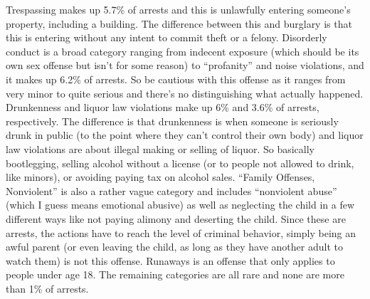 \documentclass[
]{krantz}
\begin{document}
Trespassing makes up 5.7\% of arrests and this is unlawfully
entering someone's property, including a building. The
difference between this and burglary is that this is
entering without any intent to commit theft or a felony.
Disorderly conduct is a broad category ranging from indecent
exposure (which should be its own sex offense but isn't for
some reason) to ``profanity'' and noise violations, and it
makes up 6.2\% of arrests. So be cautious with this offense
as it ranges from very minor to quite serious and there's no
distinguishing what actually happened. Drunkenness and
liquor law violations make up 6\% and 3.6\% of arrests,
respectively. The difference is that drunkenness is when
someone is seriously drunk in public (to the point where
they can't control their own body) and liquor law violations
are about illegal making or selling of liquor. So basically
bootlegging, selling alcohol without a license (or to people
not allowed to drink, like minors), or avoiding paying tax
on alcohol sales. ``Family Offenses, Nonviolent'' is also a
rather vague category and includes ``nonviolent abuse''
(which I guess means emotional abusive) as well as
neglecting the child in a few different ways like not paying
alimony and deserting the child. Since these are arrests,
the actions have to reach the level of criminal behavior,
simply being an awful parent (or even leaving the child, as
long as they have another adult to watch them) is not this
offense. Runaways is an offense that only applies to people
under age 18. The remaining categories are all rare and none
are more than 1\% of arrests.
\end{document}
